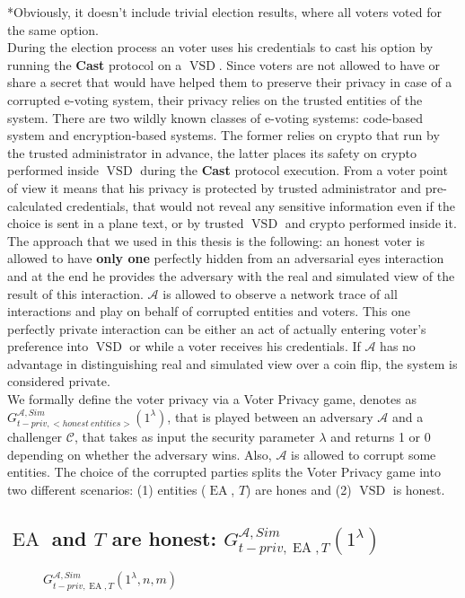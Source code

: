 \documentclass[12pt]{article}
\DeclareMathOperator{\vsd}{VSD}
\DeclareMathOperator{\ea}{EA}
\begin{document}
*Obviously, it doesn't include trivial election results, where all voters voted for the same option. \\

During the election process an voter uses his credentials to cast his option by running the \textbf{Cast} protocol on a $\vsd$. Since voters are not allowed to have or share a secret that would have helped them to preserve their privacy in case of a corrupted e-voting system, their privacy relies on the trusted entities of the system. There are two wildly known classes of e-voting systems: code-based system and encryption-based systems. The former relies on crypto that run by the trusted administrator in advance, the latter places its safety on crypto performed inside $\vsd$ during the \textbf{Cast} protocol execution. From a voter point of view it means that his privacy is protected by trusted administrator and pre-calculated credentials, that would not reveal any sensitive information even if the choice is sent in a plane text, or by trusted $\vsd$ and crypto performed inside it. \\

The approach that we used in this thesis is the following: an honest voter is allowed to have  \textbf{only one} perfectly hidden from an adversarial eyes interaction and at the end he provides the adversary with the real and simulated view of the result of this interaction. $\mathcal{A}$ is allowed to observe a network trace of all interactions and play on behalf of corrupted entities and voters. This one perfectly private interaction can be either an act of actually entering voter's preference into $\vsd$ or while a voter receives his credentials. If $\mathcal{A}$  has no advantage in distinguishing real and simulated view over a coin flip, the system is considered private. \\

We formally define the voter privacy via a Voter Privacy game, denotes as $G_{t-priv,<honest~entities>}^{\mathcal{A}, Sim}(1^{\lambda})$, that is played between an adversary $\mathcal{A}$ and a challenger $\mathcal{C}$, that takes as input the security parameter $\lambda$ and returns 1 or 0 depending on whether the adversary wins.  Also, $\mathcal{A}$ is  allowed to corrupt some entities. The choice of the corrupted parties splits the Voter Privacy game into two different scenarios: (1) entities ($\ea$, $T$) are hones and (2) $\vsd$ is honest. \\

 \subsection{$\ea$ and $T$ are honest: $G_{t-priv,\ea,T}^{\mathcal{A}, Sim}(1^{\lambda})$}
  \begin{figure}
 
        \caption{  $G_{t-priv,\ea,T}^{\mathcal{A}, Sim}(1^{\lambda},n,m)$}
\end{figure}
\end{document}
